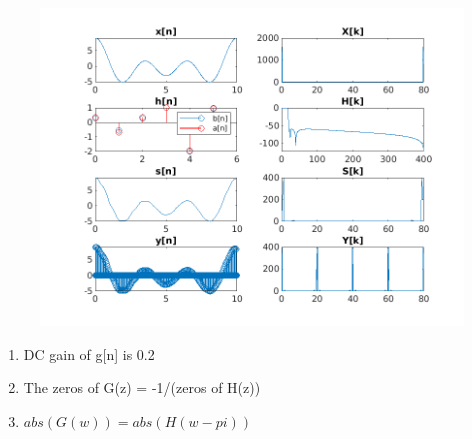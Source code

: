 \documentclass{article}
\begin{document}
\begin{figure}[H]
\centering
\includegraphics[scale=0.9]{problem1.png}
\end{figure}

\begin{enumerate}[label=(\alph*)]
    \item DC gain of g[n] is 0.2
    \item The zeros of G(z) = -1/(zeros of H(z))
    \item $abs(G(w)) = abs(H(w-pi))$
\end{enumerate}
\end{document}
